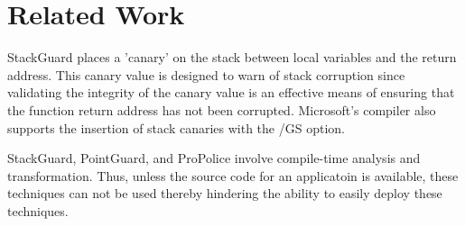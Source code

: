 
\renewcommand{\thechapter}{2}

\chapter{Related Work}

StackGuard \cite{stackguard-98} places a 'canary' on the stack between local variables and the
return address. This canary value is designed to warn of stack corruption since validating the
integrity of the canary value is an effective means of ensuring that the function return address has
not been corrupted. Microsoft's compiler also supports the insertion of stack canaries with the /GS
option.

StackGuard, PointGuard, and ProPolice involve compile-time analysis and transformation. Thus, unless
the source code for an applicatoin is available, these techniques can not be used thereby hindering
the ability to easily deploy these techniques.

